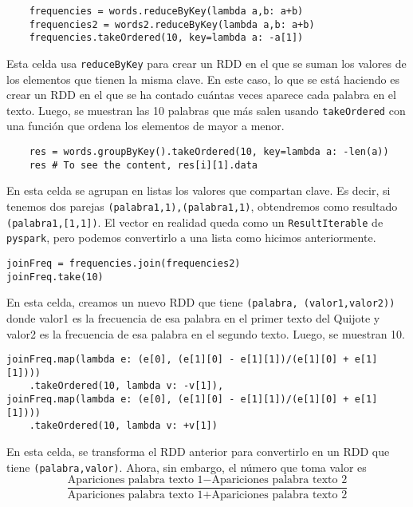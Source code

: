 \documentclass[11pt]{article}
\def\inline{\lstinline[basicstyle=\ttfamily,keywordstyle={}]}
\begin{document}
{{\begin{verbatim}
    frequencies = words.reduceByKey(lambda a,b: a+b)
    frequencies2 = words2.reduceByKey(lambda a,b: a+b)
    frequencies.takeOrdered(10, key=lambda a: -a[1])
\end{verbatim}

Esta celda usa \inline{reduceByKey} para crear un RDD en el que se suman los valores de los elementos que tienen la misma clave. En este caso, lo que se está haciendo es crear un RDD en el que se ha contado cuántas veces aparece cada palabra en el texto. Luego, se muestran las 10 palabras que más salen usando \inline{takeOrdered} con una función que ordena los elementos de mayor a menor.

\begin{verbatim}
    res = words.groupByKey().takeOrdered(10, key=lambda a: -len(a))
    res # To see the content, res[i][1].data
\end{verbatim}

En esta celda se agrupan en listas los valores que compartan clave. Es decir, si tenemos dos parejas \inline{(palabra1,1),(palabra1,1)}, obtendremos como resultado \inline{(palabra1,[1,1])}. El vector en realidad queda como un \inline{ResultIterable} de \inline{pyspark}, pero podemos convertirlo a una lista como hicimos anteriormente.



\begin{verbatim}
joinFreq = frequencies.join(frequencies2)
joinFreq.take(10)
\end{verbatim}
En esta celda, creamos un nuevo RDD que tiene \inline{(palabra, (valor1,valor2))} donde valor1 es la frecuencia de esa palabra en el primer texto del Quijote y valor2 es la frecuencia de esa palabra en el segundo texto. Luego, se muestran 10.



\begin{verbatim}
joinFreq.map(lambda e: (e[0], (e[1][0] - e[1][1])/(e[1][0] + e[1][1])))
    .takeOrdered(10, lambda v: -v[1]),
joinFreq.map(lambda e: (e[0], (e[1][0] - e[1][1])/(e[1][0] + e[1][1])))
    .takeOrdered(10, lambda v: +v[1])
\end{verbatim}

En esta celda, se transforma el RDD anterior para convertirlo en un RDD que tiene \inline{(palabra,valor)}. Ahora, sin embargo, el número que toma valor es 
\[
\frac{\text{Apariciones palabra texto 1} - \text{Apariciones palabra texto 2}}{\text{Apariciones palabra texto 1} + \text{Apariciones palabra texto 2}}    
\]

}}
\end{document}
